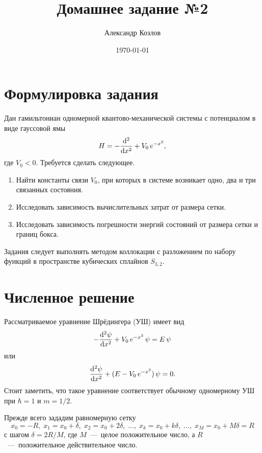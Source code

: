 \documentclass[10pt]{article}
\title{Домашнее задание №2}
\author{Александр Козлов}
\date{\today}
\begin{document}
\maketitle

\section*{Формулировка задания}

Дан гамильтониан одномерной квантово-механической системы с потенциалом в виде гауссовой ямы
\begin{equation}
    H = - \dv[2]{}{x} + V_0\, e^{-x^2},
\end{equation}
где $V_0 < 0$. Требуется сделать следующее.

\begin{enumerate}
    \item Найти константы связи $V_0$, при которых в системе возникает одно, два и три связанных состояния.

    \item Исследовать зависимость вычислительных затрат от размера сетки.

    \item Исследовать зависимость погрешности энергий состояний от размера сетки и границ бокса.
\end{enumerate}

Задания следует выполнять методом коллокации с разложением по набору функций в пространстве кубических сплайнов $S_{3,2}$.

\section{Численное решение}

Рассматриваемое уравнение Шрёдингера (УШ) имеет вид
\begin{equation}
    -\dv[2]{\psi}{x} + V_0\, e^{-x^2}\, \psi  = E\, \psi
    \label{eq:SE}
\end{equation}
или
\begin{equation}
    \dv[2]{\psi}{x}  + (E - V_0\, e^{-x^2})\, \psi  = 0.
\end{equation}
Стоит заметить, что такое уравнение соответствует обычному одномерному УШ при $\hbar=1$ и $m=1/2$.

Прежде всего зададим равномерную сетку
\begin{equation}
    x_0 = -R,\; x_1 = x_0 + \delta,\; x_2 = x_0 + 2\delta,\; \ldots,\; x_k = x_0 + k\delta,\; \ldots,\; x_M = x_0 + M \delta = R
\end{equation}
с шагом $\delta = 2R/M$, где $M$~---~целое положительное число, а $R$~---~положительное действительное число.
\end{document}
